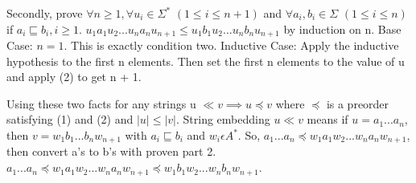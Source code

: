 \documentclass[12pt]{article}
\begin{document}
\medskip

Secondly, prove
$ \forall n \ge 1, \forall u_i \in \Sigma^\ast$ $(1 \le i \le n+1)$ and $\forall a_i,b_i \in \Sigma$ $(1 \le i \le n)$ 
if $a_i \sqsubseteq b_i, i \ge 1$.
\newline
$u_1a_1u_2...u_na_nu_{n+1} \le u_1b_1u_2...u_nb_nu_{n+1}$ by induction on n.
\newline
Base Case: $n=1$. This is exactly condition two. 
\newline 
Inductive Case: Apply the inductive hypothesis to the 
first n elements. Then set the first n elements to the value of u and apply (2) to get n + 1.
\medskip

Using these two facts for any strings u $\ll v \implies u \preceq v$ where $\preceq$ is a preorder satisfying (1) and 
(2) and $|u| \le |v|$. String embedding $u \ll v$ means if $u=a_1 ...a_n$, then $v=w_1 b_1 ... b_n w_{n+1}$
with $a_i \sqsubseteq b_i$ and $w_i \epsilon A^{\ast}$. So, $a_1 ... a_n  \preceq w_1 a_1 w_2 ... w_n a_n w_{n+1}$, then convert
a's to b's with proven part 2. $a_1 ... a_n  \preceq w_1 a_1 w_2 ... w_n a_n w_{n+1} \preceq w_1 b_1 w_2 ... w_n b_n w_{n+1}$.
\end{document}
